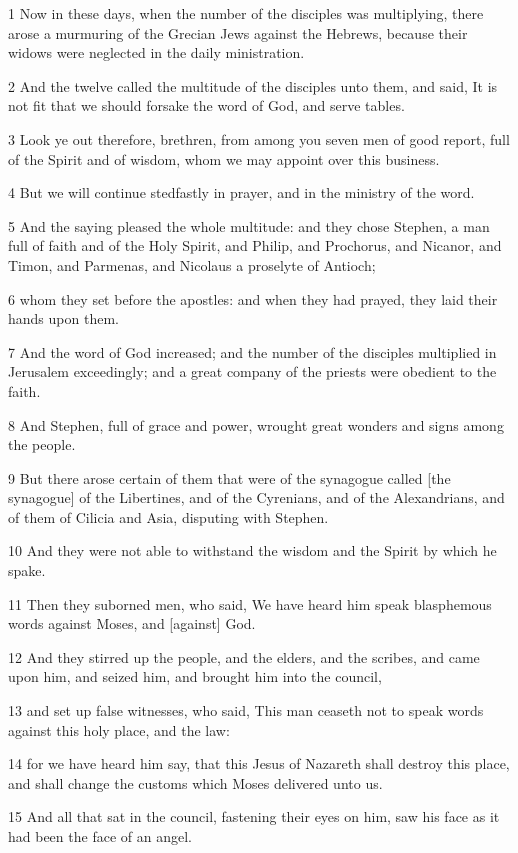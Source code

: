 \par 1 Now in these days, when the number of the disciples was multiplying, there arose a murmuring of the Grecian Jews against the Hebrews, because their widows were neglected in the daily ministration.
\par 2 And the twelve called the multitude of the disciples unto them, and said, It is not fit that we should forsake the word of God, and serve tables.
\par 3 Look ye out therefore, brethren, from among you seven men of good report, full of the Spirit and of wisdom, whom we may appoint over this business.
\par 4 But we will continue stedfastly in prayer, and in the ministry of the word.
\par 5 And the saying pleased the whole multitude: and they chose Stephen, a man full of faith and of the Holy Spirit, and Philip, and Prochorus, and Nicanor, and Timon, and Parmenas, and Nicolaus a proselyte of Antioch;
\par 6 whom they set before the apostles: and when they had prayed, they laid their hands upon them.
\par 7 And the word of God increased; and the number of the disciples multiplied in Jerusalem exceedingly; and a great company of the priests were obedient to the faith.
\par 8 And Stephen, full of grace and power, wrought great wonders and signs among the people.
\par 9 But there arose certain of them that were of the synagogue called [the synagogue] of the Libertines, and of the Cyrenians, and of the Alexandrians, and of them of Cilicia and Asia, disputing with Stephen.
\par 10 And they were not able to withstand the wisdom and the Spirit by which he spake.
\par 11 Then they suborned men, who said, We have heard him speak blasphemous words against Moses, and [against] God.
\par 12 And they stirred up the people, and the elders, and the scribes, and came upon him, and seized him, and brought him into the council,
\par 13 and set up false witnesses, who said, This man ceaseth not to speak words against this holy place, and the law:
\par 14 for we have heard him say, that this Jesus of Nazareth shall destroy this place, and shall change the customs which Moses delivered unto us.
\par 15 And all that sat in the council, fastening their eyes on him, saw his face as it had been the face of an angel.

